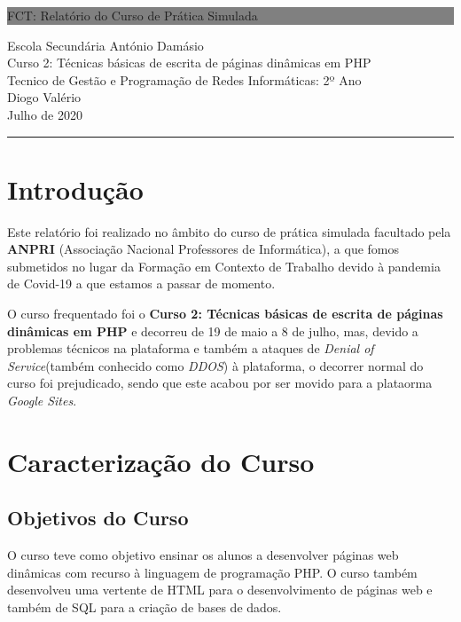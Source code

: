 \documentclass[14pt]{article}
\begin{document}
\begin{titlepage}

	\colorbox{grey}{
		\parbox[t]{0.93\textwidth}{ %
			\parbox[t]{0.91\textwidth}{ %
				\raggedleft
				\fontsize{60pt}{70pt}\selectfont
				\vspace{0.5cm}

				FCT: Relatório do Curso de Prática Simulada\\


				\vspace{0.5cm}
			}
		}
	}
	\vfill

	\parbox[t]{0.93\textwidth}{
		\raggedleft
		\large
		{\Large
   	Escola Secundária António Damásio\\[4pt]
    \large Curso 2: Técnicas básicas de escrita de páginas dinâmicas em PHP\\[2pt]
    \large Tecnico de Gestão e Programação de Redes Informáticas: 2º Ano\\[2pt]
    \Large Diogo Valério}\\[4pt]
    Julho de 2020\\[1pt]
		\hfill\rule{0.6\linewidth}{1pt}
	}
\end{titlepage}


\tableofcontents
\newpage

\section{Introdução} \label{introducao}
Este relatório foi realizado no âmbito do curso de prática simulada facultado pela \textbf{ANPRI} (Associação Nacional Professores de Informática), a que fomos submetidos no lugar da
Formação em Contexto de Trabalho devido à pandemia de Covid-19 a que estamos a passar de momento.

O curso frequentado foi o \textbf{Curso 2: Técnicas básicas de escrita de páginas dinâmicas em PHP} e decorreu de 19 de maio a
8 de julho, mas, devido a problemas técnicos na plataforma e também a ataques de \textit{Denial of Service}(também conhecido como \textit{DDOS})
à plataforma, o decorrer normal do curso foi prejudicado, sendo que este acabou por ser movido para a plataorma \textit{Google Sites}.


\section{Caracterização do Curso}
\subsection{Objetivos do Curso}
O curso teve como objetivo ensinar os alunos a
desenvolver páginas web dinâmicas com recurso à linguagem de programação PHP.
O curso também desenvolveu uma vertente de HTML para o desenvolvimento de páginas web e também de SQL para a criação de bases de dados.
\end{document}
